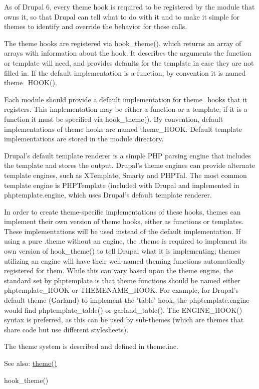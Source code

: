 As of Drupal 6, every theme hook is required to be registered by the module that owns it, so that Drupal can tell what to do with it and to make it simple for themes to identify and override the behavior for these calls.

The theme hooks are registered via hook\_\-theme(), which returns an array of arrays with information about the hook. It describes the arguments the function or template will need, and provides defaults for the template in case they are not filled in. If the default implementation is a function, by convention it is named theme\_\-HOOK().

Each module should provide a default implementation for theme\_\-hooks that it registers. This implementation may be either a function or a template; if it is a function it must be specified via hook\_\-theme(). By convention, default implementations of theme hooks are named theme\_\-HOOK. Default template implementations are stored in the module directory.

Drupal's default template renderer is a simple PHP parsing engine that includes the template and stores the output. Drupal's theme engines can provide alternate template engines, such as XTemplate, Smarty and PHPTal. The most common template engine is PHPTemplate (included with Drupal and implemented in phptemplate.engine, which uses Drupal's default template renderer.

In order to create theme-specific implementations of these hooks, themes can implement their own version of theme hooks, either as functions or templates. These implementations will be used instead of the default implementation. If using a pure .theme without an engine, the .theme is required to implement its own version of hook\_\-theme() to tell Drupal what it is implementing; themes utilizing an engine will have their well-named theming functions automatically registered for them. While this can vary based upon the theme engine, the standard set by phptemplate is that theme functions should be named either phptemplate\_\-HOOK or THEMENAME\_\-HOOK. For example, for Drupal's default theme (Garland) to implement the 'table' hook, the phptemplate.engine would find phptemplate\_\-table() or garland\_\-table(). The ENGINE\_\-HOOK() syntax is preferred, as this can be used by sub-themes (which are themes that share code but use different stylesheets).

The theme system is described and defined in theme.inc.

\begin{Desc}
\item[See also:]\hyperlink{includes_2theme_8inc_0512a0a56fd1e056cb48bcb694fa8b12}{theme()} 

hook\_\-theme() \end{Desc}


